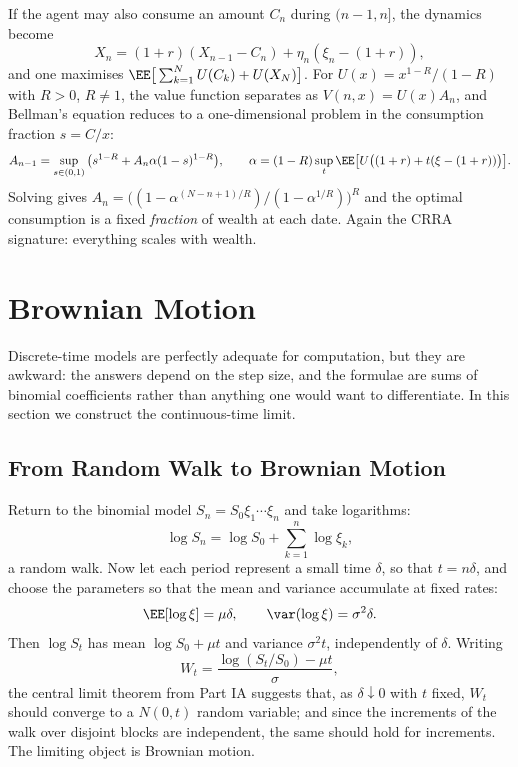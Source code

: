 \begin{example}
	If the agent may also consume an amount $C_n$ during $(n-1,n]$, the dynamics become
	$$
	X_n = (1+r)(X_{n-1}-C_n) + \eta_n(\xi_n - (1+r)),
	$$
	and one maximises $\EE\big[\sum_{k=1}^N U(C_k) + U(X_N)\big]$. For $U(x) = x^{1-R}/(1-R)$ with $R>0$, $R\neq1$, the value function separates as $V(n,x) = U(x)A_n$, and Bellman's equation reduces to a one-dimensional problem in the consumption fraction $s = C/x$:
	$$
	A_{n-1} = \sup_{s\in(0,1)}\big(s^{1-R} + A_n\alpha(1-s)^{1-R}\big), \qquad \alpha = (1-R)\sup_t \EE\big[U\big((1+r)+t(\xi-(1+r))\big)\big].
	$$
	Solving gives $A_n = \big((1-\alpha^{(N-n+1)/R})/(1-\alpha^{1/R})\big)^R$ and the optimal consumption is a fixed \emph{fraction} of wealth at each date. Again the CRRA signature: everything scales with wealth.
\end{example}

\section{Brownian Motion}

Discrete-time models are perfectly adequate for computation, but they are awkward: the answers depend on the step size, and the formulae are sums of binomial coefficients rather than anything one would want to differentiate. In this section we construct the continuous-time limit.

\subsection{From Random Walk to Brownian Motion}

Return to the binomial model $S_n = S_0\xi_1\cdots\xi_n$ and take logarithms:
$$
\log S_n = \log S_0 + \sum_{k=1}^n \log \xi_k,
$$
a random walk. Now let each period represent a small time $\delta$, so that $t = n\delta$, and choose the parameters so that the mean and variance accumulate at fixed rates:
$$
\EE[\log\xi] = \mu\delta, \qquad \var(\log\xi) = \sigma^2\delta.
$$
Then $\log S_t$ has mean $\log S_0 + \mu t$ and variance $\sigma^2 t$, independently of $\delta$. Writing
$$
W_t = \frac{\log(S_t/S_0) - \mu t}{\sigma},
$$
the central limit theorem from Part IA suggests that, as $\delta \downarrow 0$ with $t$ fixed, $W_t$ should converge to a $N(0,t)$ random variable; and since the increments of the walk over disjoint blocks are independent, the same should hold for increments. The limiting object is Brownian motion.

